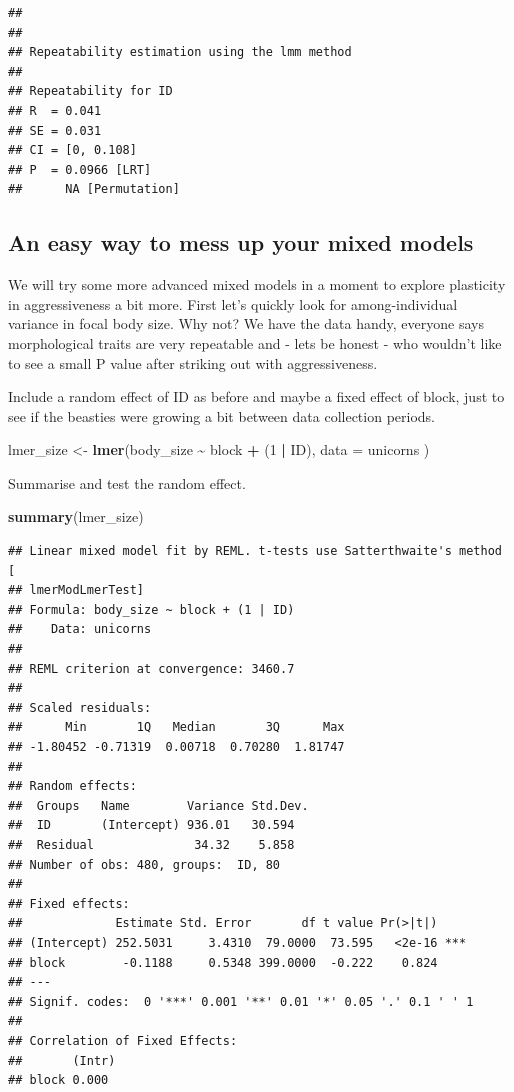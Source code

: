 \documentclass[
  12pt,
]{book}
\newenvironment{Shaded}{\begin{snugshade}}{\end{snugshade}}
\newcommand{\DataTypeTok}[1]{\textcolor[rgb]{0.13,0.29,0.53}{#1}}
\newcommand{\DecValTok}[1]{\textcolor[rgb]{0.00,0.00,0.81}{#1}}
\newcommand{\KeywordTok}[1]{\textcolor[rgb]{0.13,0.29,0.53}{\textbf{#1}}}
\newcommand{\NormalTok}[1]{#1}
\newcommand{\OperatorTok}[1]{\textcolor[rgb]{0.81,0.36,0.00}{\textbf{#1}}}
\newcommand{\StringTok}[1]{\textcolor[rgb]{0.31,0.60,0.02}{#1}}
\begin{document}
\begin{verbatim}
## 
## 
## Repeatability estimation using the lmm method 
## 
## Repeatability for ID
## R  = 0.041
## SE = 0.031
## CI = [0, 0.108]
## P  = 0.0966 [LRT]
##      NA [Permutation]
\end{verbatim}

\hypertarget{an-easy-way-to-mess-up-your-mixed-models}{%
\subsection{An easy way to mess up your mixed models}\label{an-easy-way-to-mess-up-your-mixed-models}}

We will try some more advanced mixed models in a moment to explore plasticity in aggressiveness a bit more. First let's quickly look for among-individual variance in focal body size. Why not? We have the data handy, everyone says morphological traits are very repeatable and - lets be honest - who wouldn't like to see a small P value after striking out with aggressiveness.

Include a random effect of ID as before and maybe a fixed effect of block, just to see if the beasties were growing a bit between data collection periods.

\begin{Shaded}
\begin{Highlighting}[]
\NormalTok{lmer\_size \textless{}{-}}\StringTok{ }\KeywordTok{lmer}\NormalTok{(body\_size }\OperatorTok{\textasciitilde{}}\StringTok{ }\NormalTok{block }\OperatorTok{+}\StringTok{ }\NormalTok{(}\DecValTok{1} \OperatorTok{|}\StringTok{ }\NormalTok{ID),}
  \DataTypeTok{data =}\NormalTok{ unicorns}
\NormalTok{)}
\end{Highlighting}
\end{Shaded}

Summarise and test the random effect.

\begin{Shaded}
\begin{Highlighting}[]
\KeywordTok{summary}\NormalTok{(lmer\_size)}
\end{Highlighting}
\end{Shaded}

\begin{verbatim}
## Linear mixed model fit by REML. t-tests use Satterthwaite's method [
## lmerModLmerTest]
## Formula: body_size ~ block + (1 | ID)
##    Data: unicorns
## 
## REML criterion at convergence: 3460.7
## 
## Scaled residuals: 
##      Min       1Q   Median       3Q      Max 
## -1.80452 -0.71319  0.00718  0.70280  1.81747 
## 
## Random effects:
##  Groups   Name        Variance Std.Dev.
##  ID       (Intercept) 936.01   30.594  
##  Residual              34.32    5.858  
## Number of obs: 480, groups:  ID, 80
## 
## Fixed effects:
##             Estimate Std. Error       df t value Pr(>|t|)    
## (Intercept) 252.5031     3.4310  79.0000  73.595   <2e-16 ***
## block        -0.1188     0.5348 399.0000  -0.222    0.824    
## ---
## Signif. codes:  0 '***' 0.001 '**' 0.01 '*' 0.05 '.' 0.1 ' ' 1
## 
## Correlation of Fixed Effects:
##       (Intr)
## block 0.000
\end{verbatim}
\end{document}
